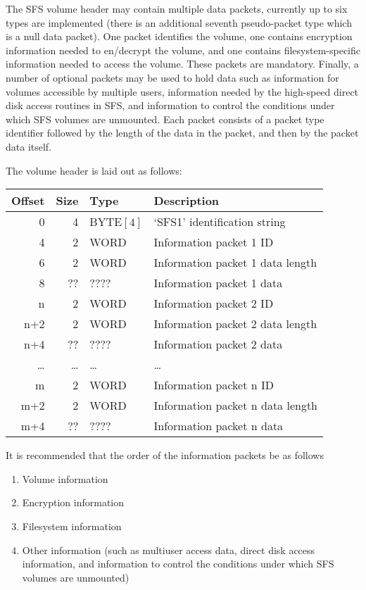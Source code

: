 The SFS volume header may contain multiple data packets, currently up to six
types are implemented (there is an additional seventh pseudo-packet type which 
is a null data packet).  One packet identifies the volume, one contains 
encryption information needed to en/decrypt the volume, and one contains
filesystem-specific information needed to access the volume.  These packets 
are mandatory.  Finally, a number of optional packets may be used to hold data
such as information for volumes accessible by multiple users, information
needed by the high-speed direct disk access routines in SFS, and information to
control the conditions under which SFS volumes are unmounted.  Each packet 
consists of a packet type identifier followed by the length of the data in the 
packet, and then by the packet data itself.

The volume header is laid out as follows:

\begin{center}
\begin{tabular}{|r|r|l|l|}
\hline
    Offset & Size & Type  &     Description\\
\hline
       0   &  4   & BYTE$[ 4 ]$ & `SFS1' identification string\\
       4   &  2   & WORD      & Information packet 1 ID\\
       6   &  2   & WORD      & Information packet 1 data length\\
       8   & ??   & ????      & Information packet 1 data\\
       n   &  2   & WORD      & Information packet 2 ID\\
     n+2   &  2   & WORD      & Information packet 2 data length\\
     n+4   & ??   & ????      & Information packet 2 data\\
    \dots  & \dots& \dots     & \dots \\
       m   &  2   & WORD      & Information packet n ID\\
     m+2   &  2   & WORD      & Information packet n data length\\
     m+4   & ??   & ????      & Information packet n data\\
\hline
\end{tabular}
\end{center}

It is recommended that the order of the information packets be as follows

\begin{enumerate}
    \item  Volume information
    \item  Encryption information
    \item  Filesystem information
    \item  Other information (such as multiuser access data, direct disk access
        information, and information to control the conditions under which SFS
        volumes are unmounted)
\end{enumerate}

